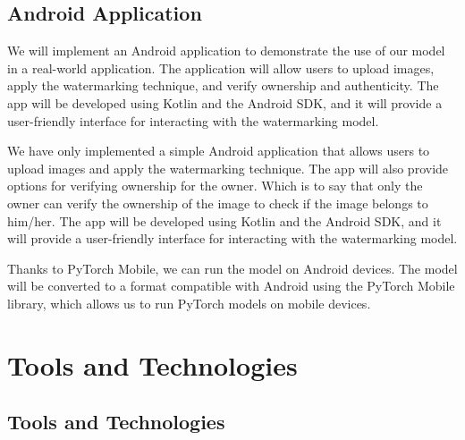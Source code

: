 \documentclass[acmsmall, nonacm]{acmart}
\begin{document}
\subsection{Android Application}\label{subsec:android-application}

We will implement an Android application to demonstrate the use of our model in a real-world application. The application will allow users to upload images, apply the watermarking technique, and verify ownership and authenticity. The app will be developed using Kotlin and the Android SDK, and it will provide a user-friendly interface for interacting with the watermarking model.

We have only implemented a simple Android application that allows users to upload images and apply the watermarking technique. The app will also provide options for verifying ownership for the owner. Which is to say that only the owner can verify the ownership of the image to check if the image belongs to him/her. The app will be developed using Kotlin and the Android SDK, and it will provide a user-friendly interface for interacting with the watermarking model.

Thanks to PyTorch Mobile, we can run the model on Android devices. The model will be converted to a format compatible with Android using the PyTorch Mobile library, which allows us to run PyTorch models on mobile devices.

\section{Tools and Technologies}\label{sec:tools-and-technologies}



\subsection{Tools and Technologies}\label{subsec:tools-and-technologies}
\end{document}
